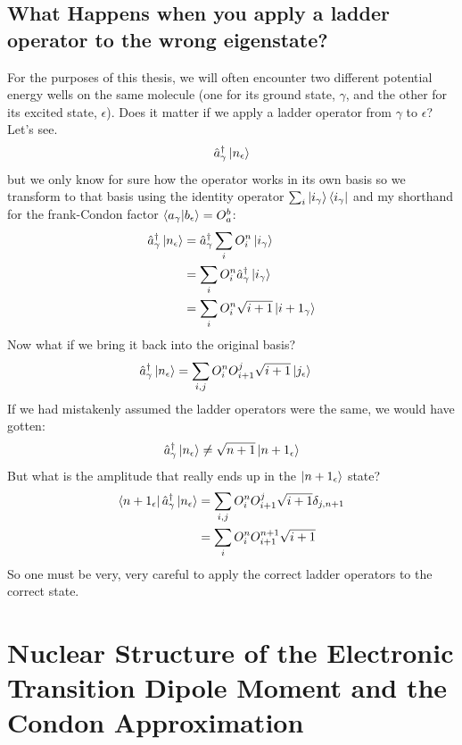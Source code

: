 \subsection{What Happens when you apply a ladder operator to the wrong eigenstate?}
For the purposes of this thesis, we will often encounter two different potential energy wells on the same molecule (one for its ground state, $\gamma$,  and the other for its excited state, $\epsilon$).  Does it matter if we apply a ladder operator from $\gamma$ to $\epsilon$?  Let's see.
\begin{align*}
	\hat{a}^{\dagger}_{\gamma} \ket{n_{\epsilon}}
\end{align*}
but we only know for sure how the operator works in its own basis so we transform to that basis using the identity operator $\sum_i \ket{i_{\gamma}}\bra{i_{\gamma}}$ and my shorthand for the frank-Condon factor $\braket{a_{\gamma}|b_{\epsilon}} = O_a^b$:
\begin{align*}
	\hat{a}^{\dagger}_{\gamma} \ket{n_{\epsilon}} &= \hat{a}^{\dagger}_{\gamma} \sum_{i} O_{i}^{n}\ket{i_{\gamma}} \\
	&= \sum_{i} O_{i}^{n} \hat{a}^{\dagger}_{\gamma} \ket{i_{\gamma}}\\
	&= \sum_{i} O_{i}^{n} \sqrt{i + 1} \ket{i + 1_{\gamma}}
\end{align*}
Now what if we bring it back into the original basis?
\begin{align*}
	\hat{a}^{\dagger}_{\gamma} \ket{n_{\epsilon}} &= \sum_{i,j} O_{i}^{n} O_{i + 1}^{j}  \sqrt{i + 1} \ket{j_{\epsilon}}
\end{align*}
If we had mistakenly assumed the ladder operators were the same, we would have gotten:
\begin{align*}
	\hat{a}^{\dagger}_{\gamma} \ket{n_{\epsilon}} \neq \sqrt{n+1} \ket{n+1_{\epsilon}}
\end{align*}
But what is the amplitude that really ends up in the $\ket{n+1_{\epsilon}}$ state?
\begin{align*}
	\bra{n+1_{\epsilon}}\hat{a}^{\dagger}_{\gamma} \ket{n_{\epsilon}} &= \sum_{i,j} O_{i}^{n} O_{i + 1}^{j}  \sqrt{i + 1}\delta_{j,n+1} \\
	 &= \sum_{i} O_{i}^{n} O_{i + 1}^{n+1}  \sqrt{i + 1}
\end{align*}
So one must be very, very careful to apply the correct ladder operators to the correct state.



\section{Nuclear Structure of the Electronic Transition Dipole Moment and the Condon Approximation}

